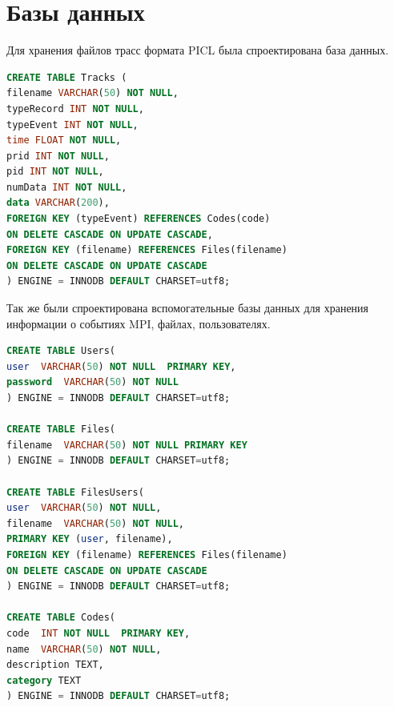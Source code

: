 \section{Базы данных}
Для хранения файлов трасс формата PICL была спроектирована база данных.
\begin{lstlisting}[language=SQL]
CREATE TABLE Tracks ( 
filename VARCHAR(50) NOT NULL,
typeRecord INT NOT NULL,
typeEvent INT NOT NULL,
time FLOAT NOT NULL,
prid INT NOT NULL,
pid INT NOT NULL,
numData INT NOT NULL,
data VARCHAR(200),
FOREIGN KEY (typeEvent) REFERENCES Codes(code) 
ON DELETE CASCADE ON UPDATE CASCADE,
FOREIGN KEY (filename) REFERENCES Files(filename) 
ON DELETE CASCADE ON UPDATE CASCADE
) ENGINE = INNODB DEFAULT CHARSET=utf8;
\end{lstlisting}
Так же были спроектирована вспомогательные базы данных для хранения информации о событиях MPI, файлах, пользователях.
\begin{lstlisting}[language=SQL]
CREATE TABLE Users(
user  VARCHAR(50) NOT NULL  PRIMARY KEY,
password  VARCHAR(50) NOT NULL
) ENGINE = INNODB DEFAULT CHARSET=utf8;

CREATE TABLE Files(
filename  VARCHAR(50) NOT NULL PRIMARY KEY
) ENGINE = INNODB DEFAULT CHARSET=utf8;

CREATE TABLE FilesUsers(
user  VARCHAR(50) NOT NULL,
filename  VARCHAR(50) NOT NULL,
PRIMARY KEY (user, filename), 
FOREIGN KEY (filename) REFERENCES Files(filename)
ON DELETE CASCADE ON UPDATE CASCADE 
) ENGINE = INNODB DEFAULT CHARSET=utf8;

CREATE TABLE Codes(
code  INT NOT NULL  PRIMARY KEY,
name  VARCHAR(50) NOT NULL,
description TEXT,
category TEXT
) ENGINE = INNODB DEFAULT CHARSET=utf8;

\end{lstlisting} 

